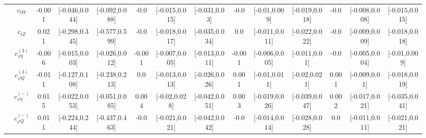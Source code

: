 \documentclass{article}
\begin{document}
\begin{table}[H]
\begin{tabular}{|c|c|c|c|c|c|c|c|c|c|c|c|c|c|}
 & $c_{tW}$ & -0.001                             & [-0.046,0.044]                                 & [-0.092,0.088] & -0.0                             & [-0.015,0.015]                                 & [-0.031,0.03] & -0.0                             & [-0.01,0.009]                                 & [-0.019,0.018] & -0.0                             & [-0.008,0.008]                                 & [-0.015,0.015] \\ \cline{2-14}
 & $c_{tZ}$ & 0.021                             & [-0.298,0.345]                                 & [-0.577,0.599] & -0.0                             & [-0.018,0.017]                                 & [-0.035,0.034] & 0.0                             & [-0.011,0.011]                                 & [-0.022,0.022] & -0.0                             & [-0.009,0.009]                                 & [-0.018,0.018] \\ \cline{2-14}
 & $c_{\varphi q}^{(3)}$ & -0.006                             & [-0.015,0.003]                                 & [-0.026,0.012] & -0.001                             & [-0.007,0.005]                                 & [-0.013,0.011] & -0.001                             & [-0.006,0.005]                                 & [-0.011,0.01] & -0.0                             & [-0.005,0.004]                                 & [-0.01,0.009] \\ \cline{2-14}
 & $c_{\varphi Q}^{(3)}$ & -0.011                             & [-0.127,0.108]                                 & [-0.238,0.213] & 0.0                             & [-0.013,0.013]                                 & [-0.026,0.026] & 0.001                             & [-0.01,0.011]                                 & [-0.02,0.021] & 0.001                             & [-0.009,0.01]                                 & [-0.018,0.019] \\ \cline{2-14}
 & $c_{\varphi q}^{(-)}$ & 0.015                             & [-0.022,0.053]                                 & [-0.051,0.085] & 0.004                             & [-0.02,0.028]                                 & [-0.042,0.051] & 0.003                             & [-0.019,0.026]                                 & [-0.039,0.047] & 0.002                             & [-0.017,0.021]                                 & [-0.035,0.041] \\ \cline{2-14}
 & $c_{\varphi Q}^{(-)}$ & 0.011                             & [-0.224,0.244]                                 & [-0.437,0.463] & -0.0                             & [-0.021,0.021]                                 & [-0.042,0.042] & -0.0                             & [-0.014,0.014]                                 & [-0.028,0.028] & 0.0                             & [-0.011,0.011]                                 & [-0.021,0.021] \\ \cline{2-14}

\end{tabular}
\end{table}
\end{document}
